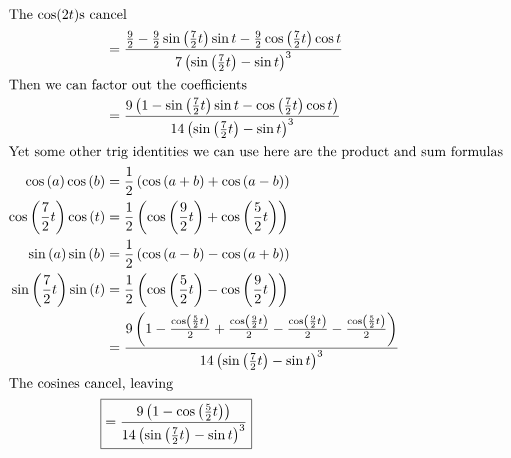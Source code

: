 \documentclass[12pt]{article}
\begin{document}
\begin{align}
  \intertext{The $\cos(2t)$s cancel}
                                                  & =\frac{\frac{9}{2}-\frac{9}{2}\sin\left(\frac{7}{2}t\right)\sin t-\frac{9}{2}\cos\left(\frac{7}{2}t\right)\cos t}{7\left(\sin\left(\frac{7}{2}t\right)-\sin t\right)^{3}}                                                                        \\
  \intertext{Then we can factor out the coefficients }
                                                  & =\frac{9\left(1-\sin\left(\frac{7}{2}t\right)\sin t-\cos\left(\frac{7}{2}t\right)\cos t\right)}{14\left(\sin\left(\frac{7}{2}t\right)-\sin t\right)^{3}}                                                                                         \\
  \intertext{Yet some other trig identities we can use here are the product and sum formulas}
  \cos\left(a\right)\cos\left(b\right)            & =\frac{1}{2}\left(\cos\left(a+b\right)+\cos\left(a-b\right)\right)                                                                                                                                                                               \\
  \cos\left(\frac{7}{2}t\right)\cos\left(t\right) & =\frac{1}{2}\left(\cos\left(\frac{9}{2}t\right)+\cos\left(\frac{5}{2}t\right)\right)                                                                                                                                                             \\
  \sin\left(a\right)\sin\left(b\right)            & =\frac{1}{2}\left(\cos\left(a-b\right)-\cos\left(a+b\right)\right)                                                                                                                                                                               \\
  \sin\left(\frac{7}{2}t\right)\sin\left(t\right) & =\frac{1}{2}\left(\cos\left(\frac{5}{2}t\right)-\cos\left(\frac{9}{2}t\right)\right)                                                                                                                                                             \\
                                                  & =\frac{9\left(1-\frac{\cos\left(\frac{5}{2}t\right)}{2}+\frac{\cos\left(\frac{9}{2}t\right)}{2}-\frac{\cos\left(\frac{9}{2}t\right)}{2}-\frac{\cos\left(\frac{5}{2}t\right)}{2}\right)}{14\left(\sin\left(\frac{7}{2}t\right)-\sin t\right)^{3}} \\
  \intertext{The $\cos$ines cancel, leaving}
  \Aboxed{                                        & =\frac{9\left(1-\cos\left(\frac{5}{2}t\right)\right)}{14\left(\sin\left(\frac{7}{2}t\right)-\sin t\right)^{3}}}
\end{align}
\end{document}
